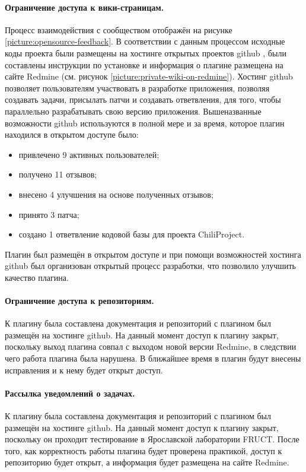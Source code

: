 \paragraph{Ограничение доступа к вики-страницам.}
Процесс взаимодействия с сообществом отображён на рисунке
\ref{picture:opensource-feedback}. В соответствии с данным процессом исходные
коды проекта были размещены на хостинге открытых проектов github \cite{github},
были составлены инструкции по установке и информация о плагине размещена
\cite{private-wiki} на сайте Redmine (см. рисунок
\ref{picture:private-wiki-on-redmine}). Хостинг github позволяет пользователям
участвовать в разработке приложения, позволяя создавать задачи, присылать патчи
и создавать ответвления, для того, чтобы параллельно разрабатывать свою версию
приложения. Вышеназванные возможности github используются в полной мере и за
время, которое плагин находился в открытом доступе было:
\begin{itemize}
  \item привлечено 9 активных пользователей;
  \item получено 11 отзывов;
  \item внесено 4 улучшения на основе полученных отзывов; 
  \item принято 3 патча;
  \item создано 1 ответвление кодовой базы для проекта ChiliProject.
\end{itemize}
Плагин был размещён в открытом доступе и при помощи возможностей хостинга
github был организован открытый процесс разработки, что позволило улучшить
качество плагина.

\paragraph{Ограничение доступа к репозиториям.}
К плагину была составлена документация и репозиторий с плагином был размещён на
хостинге github. На данный момент доступ к плагину закрыт, поскольку выход
плагина совпал с выходом новой версии Redmine, в следствии чего работа плагина
была нарушена. В ближайшее время в плагин будут внесены исправления и к нему
будет открыт доступ.

\paragraph{Рассылка уведомлений о задачах.}
К плагину была составлена документация и репозиторий с плагином был размещён на
хостинге github. На данный момент доступ к плагину закрыт, поскольку он
проходит тестирование в Ярославской лаборатории FRUCT. После того, как
корректность работы плагина будет проверена практикой, доступ к репозиторию
будет открыт, а информация будет размещена на сайте Redmine.

